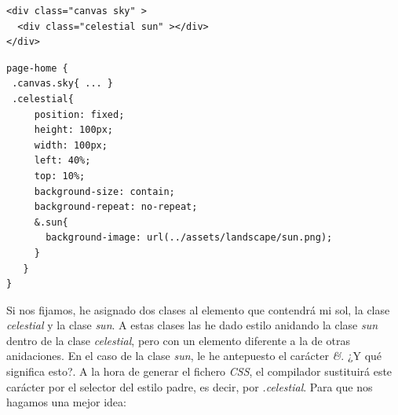 \noindent
\begin{minipage}[t]{.48\textwidth}
{\begin{lstlisting}[title={home.html}, style=htmlcssjs,frame=tlrb,xleftmargin={0.2cm}]
<div class="canvas sky" >
  <div class="celestial sun" ></div>
</div>
\end{lstlisting}}
\end{minipage}\hfill
\noindent
\begin{minipage}[t]{.48\textwidth}
{\begin{lstlisting}[title={home.scss}, style=htmlcssjs,frame=tlrb,xleftmargin={0.2cm}]
page-home {
 .canvas.sky{ ... }
 .celestial{
     position: fixed;
     height: 100px;
     width: 100px;
     left: 40%;
     top: 10%;
     background-size: contain;
     background-repeat: no-repeat;
     &.sun{
       background-image: url(../assets/landscape/sun.png);
     }
   }
}
\end{lstlisting}}
\end{minipage}

Si nos fijamos, he asignado dos clases al elemento que contendrá mi sol, la clase \emph{celestial} y la clase \emph{sun}. A estas clases las he dado estilo anidando la clase \emph{sun} dentro de la clase \emph{celestial}, pero con un elemento diferente a la de otras anidaciones. En el caso de la clase \emph{sun}, le he antepuesto el carácter \emph{\&}. ¿Y qué significa esto?. A la hora de generar el fichero \emph{CSS}, el compilador sustituirá este carácter por el selector del estilo padre, es decir, por \emph{.celestial}. Para que nos hagamos una mejor idea:


